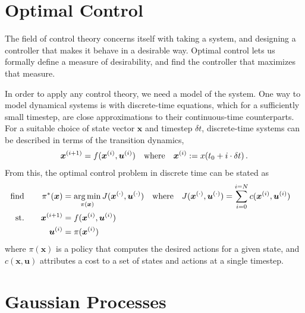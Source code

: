 \documentclass[main.tex]{subfiles}
\begin{document}
\section{Optimal Control}

	The field of control theory concerns itself with taking a system, and designing a controller that makes it behave in a desirable way.
	Optimal control lets us formally define a measure of desirability, and find the controller that maximizes that measure.

	In order to apply any control theory, we need a model of the system.
	One way to model dynamical systems is with discrete-time equations, which for a sufficiently small timestep, are close approximations to their continuous-time counterparts.
	For a suitable choice of state vector $\bm{x}$ and timestep $\delta t$, discrete-time systems can be described in terms of the transition dynamics,
	\begin{align}
		\bm{x}^{(i + 1)} = f(\bm{x}^{(i)}, \bm{u}^{(i)}) \quad \text{where} \quad \bm{x}^{(i)} := x(t_0 + i\cdot\delta t)\,. \label{eq:transition}
	\end{align}
	From this, the optimal control problem in discrete time can be stated as
	\begin{alignat}{2}
		\text{find}&& \quad
			\pi^*(\bm{x}) &= \operatorname*{arg\,min}_{\pi(\bm{x})}
				J(\bm{x}^{(\cdot)}, \bm{u}^{(\cdot)})
				\quad \text{where} \quad
				J(\bm{x}^{(\cdot)}, \bm{u}^{(\cdot)}) = \sum_{i=0}^{i=N} c(\bm{x}^{(i)}, \bm{u}^{(i)})\quad \\ \label{eq:optimal}
		\text{st.}&& \quad
			\bm{x}^{(i+1)} &= f(\bm{x}^{(i)}, \bm{u}^{(i)}) \\ \nonumber
		&&
			\bm{u}^{(i)} &= \pi(\bm{x}^{(i)})\, \nonumber
	\end{alignat}
	where $\pi(\bm{x})$ is a policy that computes the desired actions for a given state, and $c(\bm{x}, \bm{u})$ attributes a cost to a set of states and actions at a single timestep.

\section{Gaussian Processes}
\end{document}
